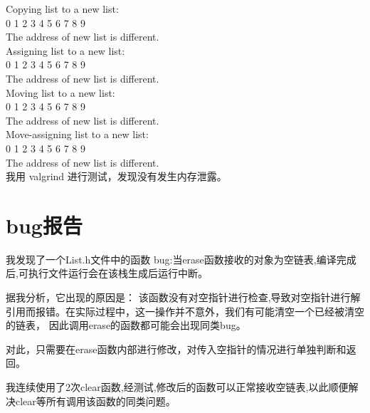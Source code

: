 \documentclass[UTF8]{ctexart}
\begin{document}
Copying list to a new list:\\
0 1 2 3 4 5 6 7 8 9 \\
The address of new list is different.\\
Assigning list to a new list:\\
0 1 2 3 4 5 6 7 8 9 \\
The address of new list is different.\\
Moving list to a new list:\\
0 1 2 3 4 5 6 7 8 9 \\
The address of new list is different.\\
Move-assigning list to a new list:\\
0 1 2 3 4 5 6 7 8 9 \\
The address of new list is different.\\
我用 valgrind 进行测试，发现没有发生内存泄露。\\

\section{bug报告}

我发现了一个List.h文件中的函数 bug:当erase函数接收的对象为空链表,编译完成后,可执行文件运行会在该栈生成后运行中断。\par
据我分析，它出现的原因是：
该函数没有对空指针进行检查,导致对空指针进行解引用而报错。在实际过程中，这一操作并不意外，我们有可能清空一个已经被清空的链表，
因此调用erase的函数都可能会出现同类bug。\par
对此，只需要在erase函数内部进行修改，对传入空指针的情况进行单独判断和返回。\par
我连续使用了2次clear函数,经测试,修改后的函数可以正常接收空链表,以此顺便解决clear等所有调用该函数的同类问题。\par
\end{document}
